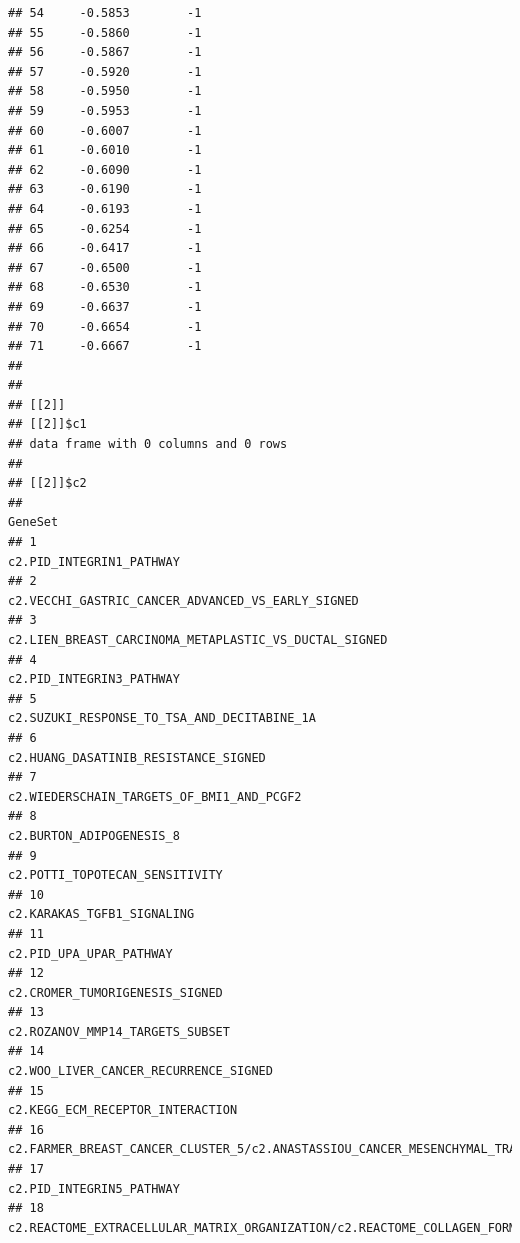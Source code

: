 \documentclass{article}\usepackage[]{graphicx}\usepackage[]{color}
\makeatletter
\newenvironment{kframe}{%
 \def\at@end@of@kframe{}%
 \ifinner\ifhmode%
  \def\at@end@of@kframe{\end{minipage}}%
  \begin{minipage}{\columnwidth}%
 \fi\fi%
 \def\FrameCommand##1{\hskip\@totalleftmargin \hskip-\fboxsep
 \colorbox{shadecolor}{##1}\hskip-\fboxsep
     \hskip-\linewidth \hskip-\@totalleftmargin \hskip\columnwidth}%
 \MakeFramed {\advance\hsize-\width
   \@totalleftmargin\z@ \linewidth\hsize
   \@setminipage}}%
 {\par\unskip\endMakeFramed%
 \at@end@of@kframe}
\newenvironment{knitrout}{}{} %
\makeatother
\begin{document}
\begin{knitrout}
\begin{kframe}
\begin{verbatim}
## 54     -0.5853        -1
## 55     -0.5860        -1
## 56     -0.5867        -1
## 57     -0.5920        -1
## 58     -0.5950        -1
## 59     -0.5953        -1
## 60     -0.6007        -1
## 61     -0.6010        -1
## 62     -0.6090        -1
## 63     -0.6190        -1
## 64     -0.6193        -1
## 65     -0.6254        -1
## 66     -0.6417        -1
## 67     -0.6500        -1
## 68     -0.6530        -1
## 69     -0.6637        -1
## 70     -0.6654        -1
## 71     -0.6667        -1
## 
## 
## [[2]]
## [[2]]$c1
## data frame with 0 columns and 0 rows
## 
## [[2]]$c2
##                                                                                                   GeneSet
## 1                                                                                c2.PID_INTEGRIN1_PATHWAY
## 2                                                       c2.VECCHI_GASTRIC_CANCER_ADVANCED_VS_EARLY_SIGNED
## 3                                                   c2.LIEN_BREAST_CARCINOMA_METAPLASTIC_VS_DUCTAL_SIGNED
## 4                                                                                c2.PID_INTEGRIN3_PATHWAY
## 5                                                             c2.SUZUKI_RESPONSE_TO_TSA_AND_DECITABINE_1A
## 6                                                                    c2.HUANG_DASATINIB_RESISTANCE_SIGNED
## 7                                                               c2.WIEDERSCHAIN_TARGETS_OF_BMI1_AND_PCGF2
## 8                                                                                c2.BURTON_ADIPOGENESIS_8
## 9                                                                          c2.POTTI_TOPOTECAN_SENSITIVITY
## 10                                                                             c2.KARAKAS_TGFB1_SIGNALING
## 11                                                                                c2.PID_UPA_UPAR_PATHWAY
## 12                                                                         c2.CROMER_TUMORIGENESIS_SIGNED
## 13                                                                        c2.ROZANOV_MMP14_TARGETS_SUBSET
## 14                                                                  c2.WOO_LIVER_CANCER_RECURRENCE_SIGNED
## 15                                                                       c2.KEGG_ECM_RECEPTOR_INTERACTION
## 16 c2.FARMER_BREAST_CANCER_CLUSTER_5/c2.ANASTASSIOU_CANCER_MESENCHYMAL_TRANSITION_SIGNATURE/c4.GNF2_CDH11
## 17                                                                               c2.PID_INTEGRIN5_PATHWAY
## 18                           c2.REACTOME_EXTRACELLULAR_MATRIX_ORGANIZATION/c2.REACTOME_COLLAGEN_FORMATION

\end{verbatim}
\end{kframe}
\end{knitrout}
\end{document}
